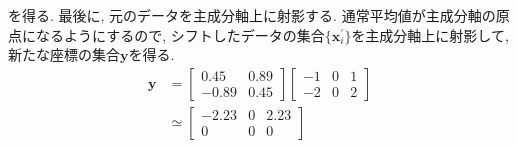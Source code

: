 を得る. 
最後に, 元のデータを主成分軸上に射影する. 
通常平均値が主成分軸の原点になるようにするので, シフトしたデータの集合$\{\mathbf{x}_{i}^{\prime}\}$を主成分軸上に射影して, 新たな座標の集合$\mathbf{y}$を得る. 
\begin{align}
  \mathbf{y} &=
  \begin{bmatrix}
     0.45 & 0.89 \\
    -0.89 & 0.45
  \end{bmatrix}
  \begin{bmatrix}
    -1 & 0 & 1 \\
    -2 & 0 & 2
 \end{bmatrix}
 \\
 &\simeq
 \begin{bmatrix}
  -2.23 & 0 & 2.23 \\
   0    & 0 & 0
\end{bmatrix}
\end{align}

